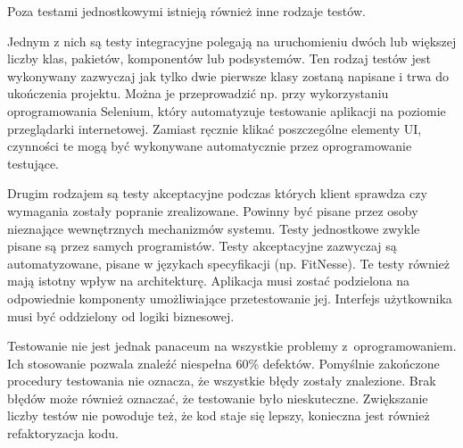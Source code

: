 
Poza testami jednostkowymi istnieją również inne rodzaje testów. 

Jednym z nich są testy integracyjne polegają na uruchomieniu dwóch lub większej liczby klas, pakietów, komponentów lub podsystemów. Ten rodzaj testów jest wykonywany zazwyczaj jak tylko dwie pierwsze klasy zostaną napisane i trwa do ukończenia projektu. Można je przeprowadzić np. przy wykorzystaniu oprogramowania Selenium, który automatyzuje testowanie aplikacji na poziomie przeglądarki internetowej. Zamiast ręcznie klikać poszczególne elementy UI, czynności te mogą być wykonywane automatycznie przez oprogramowanie testujące.


Drugim rodzajem są testy akceptacyjne podczas których klient sprawdza czy wymagania zostały popranie zrealizowane. Powinny być pisane przez osoby nieznające wewnętrznych mechanizmów systemu. Testy jednostkowe zwykle pisane są przez samych programistów. Testy akceptacyjne zazwyczaj są automatyzowane, pisane w językach specyfikacji (np. FitNesse). Te testy również mają istotny wpływ na architekturę. Aplikacja musi zostać podzielona na odpowiednie komponenty umożliwiające przetestowanie jej. Interfejs użytkownika musi być oddzielony od logiki biznesowej. 




Testowanie nie jest jednak panaceum na wszystkie problemy z~oprogramowaniem. Ich stosowanie pozwala znaleźć niespełna 60\% defektów\cite{kod_doskonaly_steve_mcconnell}. Pomyślnie zakończone procedury testowania nie oznacza, że wszystkie błędy zostały znalezione. Brak błędów może również oznaczać, że testowanie było nieskuteczne. Zwiększanie liczby testów nie powoduje też, że kod staje się lepszy, konieczna jest również refaktoryzacja kodu.


